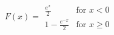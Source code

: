 

\[
F(x) = \begin{array}{ll} \frac{e^{x}} {2} & \mbox{for $x < 0$} \\ 1 - \frac{e^{-x}} {2} & \mbox{for $x \ge 0$} \end{array}
\]



